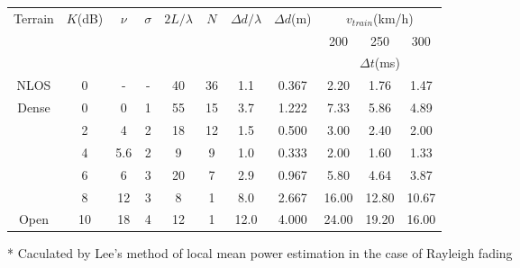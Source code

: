 \begin{table}[!htp]
\renewcommand{\arraystretch}{1}
\centering
\begin{threeparttable}[b]
\begin{tabular}{c|c|c|c|c|c|c|c|c|c|c}
\hline
\multicolumn{1}{c|}{\multirow{3}{*}{Terrain}} & \multicolumn{1}{c|}{\multirow{3}{*}{$K$(dB)}} & \multicolumn{1}{c|}{\multirow{3}{*}{$\nu$}} & \multicolumn{1}{c|}{\multirow{3}{*}{$\sigma$}} & \multicolumn{1}{c|}{\multirow{3}{*}{$2L/\lambda$}} & \multicolumn{1}{c|}{\multirow{3}{*}{$N$}} & \multicolumn{1}{c|}{\multirow{3}{*}{$\Delta d/\lambda$}} & \multicolumn{1}{c|}{\multirow{3}{*}{$\Delta d$(m)}} & \multicolumn{3}{c}{$v_{train}$(km/h)}\\
\cline{9-11}
\multicolumn{1}{c|}{} & \multicolumn{1}{c|}{} & \multicolumn{1}{c|}{} & \multicolumn{1}{c|}{} & \multicolumn{1}{c|}{} & \multicolumn{1}{c|}{} & \multicolumn{1}{c|}{} & \multicolumn{1}{c|}{} & 200 & 250 & 300\\
\cline{9-11}
\multicolumn{1}{c|}{}& \multicolumn{1}{c|}{} & \multicolumn{1}{c|}{} & \multicolumn{1}{c|}{} & \multicolumn{1}{c|}{} & \multicolumn{1}{c|}{} & \multicolumn{1}{c|}{} & \multicolumn{1}{c|}{} & \multicolumn{3}{c}{$\Delta t$(ms)}\\
\cline{1-11}
NLOS\tnote{*}  &  0 &    - & - & 40 & 36 &  1.1 & 0.367 &  2.20 &  1.76 &  1.47\\
\hline
Dense &  0 &   0 & 1 & 55 & 15 &  3.7 & 1.222 &  7.33 &  5.86 &  4.89\\
      &  2 &   4 & 2 & 18 & 12 &  1.5 & 0.500 &  3.00 &  2.40 &  2.00\\
      &  4 & 5.6 & 2 &  9 &  9 &  1.0 & 0.333 &  2.00 &  1.60 &  1.33\\
      &  6 &   6 & 3 & 20 &  7 &  2.9 & 0.967 &  5.80 &  4.64 &  3.87\\
      &  8 &  12 & 3 &  8 &  1 &  8.0 & 2.667 & 16.00 & 12.80 & 10.67\\
Open  & 10 &  18 & 4 & 12 &  1 & 12.0 & 4.000 & 24.00 & 19.20 & 16.00\\
\hline
\end{tabular}
\begin{tablenotes}
\item[*] \small Caculated by Lee's method of local mean power estimation in the case of Rayleigh fading
\end{tablenotes}
\end{threeparttable}
\end{table}

